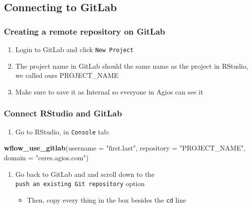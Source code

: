 \documentclass[]{book}
\newenvironment{Shaded}{\begin{snugshade}}{\end{snugshade}}
\newcommand{\DataTypeTok}[1]{\textcolor[rgb]{0.13,0.29,0.53}{#1}}
\newcommand{\KeywordTok}[1]{\textcolor[rgb]{0.13,0.29,0.53}{\textbf{#1}}}
\newcommand{\NormalTok}[1]{#1}
\newcommand{\StringTok}[1]{\textcolor[rgb]{0.31,0.60,0.02}{#1}}
\providecommand{\tightlist}{%
  \setlength{\itemsep}{0pt}\setlength{\parskip}{0pt}}
\begin{document}
\hypertarget{connecting-to-gitlab-1}{%
\subsection{Connecting to GitLab}\label{connecting-to-gitlab-1}}

\hypertarget{creating-a-remote-repository-on-gitlab}{%
\subsubsection{Creating a remote repository on GitLab}\label{creating-a-remote-repository-on-gitlab}}

\begin{enumerate}
\def\labelenumi{\arabic{enumi}.}
\tightlist
\item
  Login to GitLab and click \texttt{New\ Project}
\item
  The project name in GitLab should the same name as the project in RStudio, we called ours PROJECT\_NAME
\item
  Make sure to save it as Internal so everyone in Agios can see it
\end{enumerate}

\hypertarget{connect-rstudio-and-gitlab}{%
\subsubsection{Connect RStudio and GitLab}\label{connect-rstudio-and-gitlab}}

\begin{enumerate}
\def\labelenumi{\arabic{enumi}.}
\tightlist
\item
  Go to RStudio, in \texttt{Console} tab:
\end{enumerate}

\begin{Shaded}
\begin{Highlighting}[]
 \KeywordTok{wflow_use_gitlab}\NormalTok{(}\DataTypeTok{username =} \StringTok{"first.last"}\NormalTok{, }\DataTypeTok{repository =} \StringTok{"PROJECT_NAME"}\NormalTok{, }\DataTypeTok{domain =} \StringTok{"ceres.agios.com"}\NormalTok{)}
\end{Highlighting}
\end{Shaded}

\begin{enumerate}
\def\labelenumi{\arabic{enumi}.}
\setcounter{enumi}{1}
\tightlist
\item
  Go back to GitLab and and scroll down to the \texttt{push\ an\ existing\ Git\ repository} option

  \begin{itemize}
  \tightlist
  \item
    Then, copy every thing in the box besides the \texttt{cd} line
  \end{itemize}
\end{enumerate}
\end{document}
